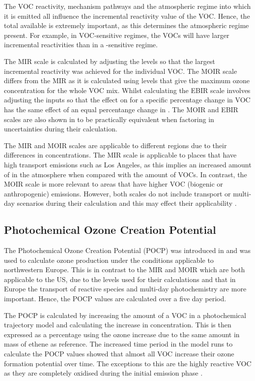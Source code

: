 The VOC reactivity, mechanism pathways and the atmospheric regime into which it is emitted all influence the incremental reactivity value of the VOC. 
Hence, the total  available is extremely important, as this determines the atmospheric regime present. 
For example, in VOC-sensitive regimes, the VOCs will have larger incremental reactivities than in a -sensitive regime.

The MIR scale is calculated by adjusting the  levels so that the largest incremental reactivity was achieved for the individual VOC. 
The MOIR scale differs from the MIR as it is calculated using  levels that give the maximum ozone concentration for the whole VOC mix.  
Whilst calculating the EBIR scale involves adjusting the  inputs so that the effect on  for a specific percentage change in VOC has the same effect of an equal percentange change in  \citep{Carter:1994}. 
The MOIR and EBIR scales are also shown in \citep{Carter:1994} to be practically equivalent when factoring in uncertainties during their calculation.

The MIR and MOIR scales are applicable to different regions due to their differences in  concentrations. 
The MIR scale is applicable to places that have high transport emissions such as Los Angeles, as this implies an increased amount of  in the atmosphere when compared with the amount of VOCs. 
In contrast, the MOIR scale is more relevant to areas that have higher VOC (biogenic or anthropogenic) emissions. 
However, both scales do not include transport or multi-day scenarios during their calculation and this may effect their applicability \citep{Capps:2010}.

\subsection{Photochemical Ozone Creation Potential}
The Photochemical Ozone Creation Potential (POCP) was introduced in \citep{Derwent:1996} and was used to calculate ozone production under the conditions applicable to northwestern Europe. 
This is in contrast to the MIR and MOIR which are both applicable to the US, due to the  levels used for their calculations and that in Europe the transport of reactive species and multi-day photochemistry are more important. 
Hence, the POCP values are calculated over a five day period.

The POCP is calculated by increasing the amount of a VOC in a photochemical trajectory model and calculating the increase in  concentration. 
This is then expressed as a percentage using the ozone increase due to the same amount in mass of ethene as reference. 
The increased time period in the model runs to calculate the POCP values showed that almost all VOC increase their ozone formation potential over time. 
The exceptions to this are the highly reactive VOC as they are completely oxidised during the initial emission phase \citep{Derwent:1996}. 

